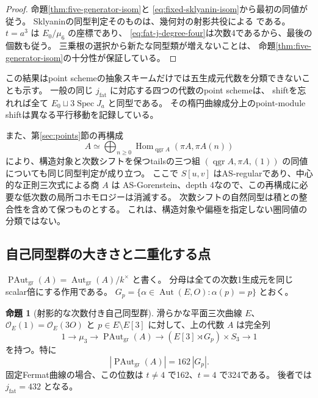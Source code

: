 \documentclass[a4paper,11pt]{ltjsarticle}
\theoremstyle{definition}
\newtheorem{theorem}{命題}[section]
\newcommand{\OO}{\mathcal O}
\newcommand{\qgr}{\operatorname{qgr}}
\begin{document}
\begin{proof}
命題\ref{thm:five-generator-isom}と
\eqref{eq:fixed-sklyanin-isom}から最初の同値が従う。
Sklyaninの同型判定そのものは、幾何対の射影共役による
\cite[Theorem 2.8, Theorem 4.16]{IMRelations}である。
$t=a^3$ は $E_0/\mu_6$ の座標であり、
\eqref{eq:fat-j-degree-four}は次数4であるから、最後の個数も従う。
三乗根の選択から新たな同型類が増えないことは、
命題\ref{thm:five-generator-isom}の十分性が保証している。
\end{proof}

この結果はpoint schemeの抽象スキームだけでは五生成元代数を分類できないことも示す。
一般の同じ $j_{\mathrm{fat}}$ に対応する四つの代数のpoint schemeは、
shiftを忘れれば全て $E_0\sqcup3\operatorname{Spec}J_a$ と同型である。
その楕円曲線成分上のpoint-module shiftは異なる平行移動を記録している。

また、第\ref{sec:points}節の再構成
\[
 A\simeq\bigoplus_{n\ge0}
 \operatorname{Hom}_{\qgr A}(\pi A,\pi A(n))
\]
により、構造対象と次数シフトを保つtailsの三つ組
$(\qgr A,\pi A,(1))$ の同値についても同じ同型判定が成り立つ。
ここで $S[u,v]$ はAS-regularであり、中心的な正則三次式による商 $A$ は
AS-Gorenstein、depth 4なので、この再構成に必要な低次数の局所コホモロジーは消滅する。
次数シフトの自然同型は積との整合性を含めて保つものとする。
これは、構造対象や偏極を指定しない圏同値の分類ではない。

\subsection{自己同型群の大きさと二重化する点}

$\operatorname{PAut}_{\mathrm{gr}}(A)
=\operatorname{Aut}_{\mathrm{gr}}(A)/k^\times$ と書く。
分母は全ての次数1生成元を同じscalar倍にする作用である。
$G_p=\{\alpha\in\operatorname{Aut}(E,O):\alpha(p)=p\}$ とおく。

\begin{theorem}[射影的な次数付き自己同型群]\label{thm:graded-automorphisms}
滑らかな平面三次曲線 $E$、$\OO_E(1)=\OO_E(3O)$ と
$p\in E\setminus E[3]$ に対して、上の代数 $A$ は完全列
\[
 1\longrightarrow\mu_3
 \longrightarrow\operatorname{PAut}_{\mathrm{gr}}(A)
 \longrightarrow(E[3]\rtimes G_p)\times S_3
 \longrightarrow1
\]
を持つ。特に
\[
 |\operatorname{PAut}_{\mathrm{gr}}(A)|=162\,|G_p|.
\]
固定Fermat曲線の場合、この位数は $t\ne4$ で162、$t=4$ で324である。
後者では $j_{\mathrm{fat}}=432$ となる。
\end{theorem}
\end{document}

